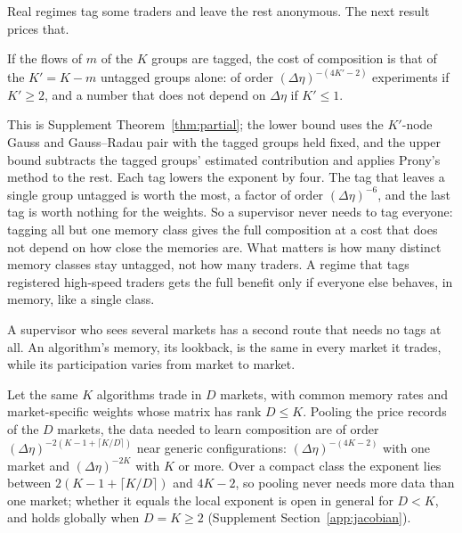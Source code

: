 Real regimes tag some traders and leave the rest anonymous. The next result prices that.

\begin{theorem}\label{n:partial}
If the flows of $m$ of the $K$ groups are tagged, the cost of composition is that of the $K'=K-m$ untagged groups alone: of order $(\Delta\eta)^{-(4K'-2)}$ experiments if $K'\ge2$, and a number that does not depend on $\Delta\eta$ if $K'\le1$.
\end{theorem}

This is Supplement Theorem~\ref{thm:partial}; the lower bound uses the $K'$-node Gauss and Gauss--Radau pair with the tagged groups held fixed, and the upper bound subtracts the tagged groups' estimated contribution and applies Prony's method to the rest. Each tag lowers the exponent by four. The tag that leaves a single group untagged is worth the most, a factor of order $(\Delta\eta)^{-6}$, and the last tag is worth nothing for the weights. So a supervisor never needs to tag everyone: tagging all but one memory class gives the full composition at a cost that does not depend on how close the memories are. What matters is how many distinct memory classes stay untagged, not how many traders. A regime that tags registered high-speed traders gets the full benefit only if everyone else behaves, in memory, like a single class.

A supervisor who sees several markets has a second route that needs no tags at all. An algorithm's memory, its lookback, is the same in every market it trades, while its participation varies from market to market.

\begin{theorem}\label{n:pool}
Let the same $K$ algorithms trade in $D$ markets, with common memory rates and market-specific weights whose matrix has rank $D\le K$. Pooling the price records of the $D$ markets, the data needed to learn composition are of order $(\Delta\eta)^{-2(K-1+\lceil K/D\rceil)}$ near generic configurations: $(\Delta\eta)^{-(4K-2)}$ with one market and $(\Delta\eta)^{-2K}$ with $K$ or more. Over a compact class the exponent lies between $2(K-1+\lceil K/D\rceil)$ and $4K-2$, so pooling never needs more data than one market; whether it equals the local exponent is open in general for $D < K$, and holds globally when $D = K \ge 2$ (Supplement Section~\ref{app:jacobian}).
\end{theorem}

